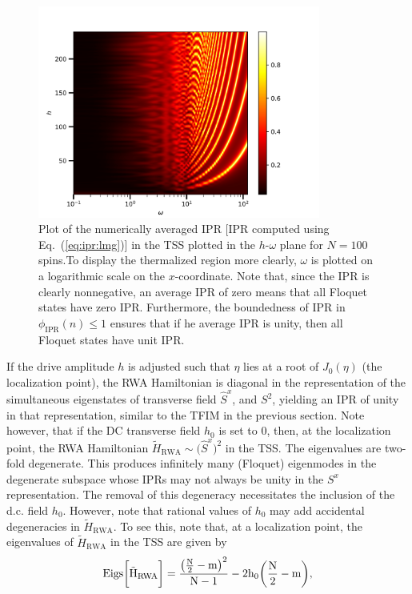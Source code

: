 \documentclass[%
reprint,
superscriptaddress,
amsmath,amssymb,
aps,
prb,
showkeys,
]{revtex4-2}
\begin{document}
\begin{figure}[t!]
	\centering
	\includegraphics[width=9.3cm]{figure_4.jpeg}
	\caption{Plot of the numerically averaged IPR [IPR computed using Eq.~(\ref{eq:ipr:lmg})] in the TSS plotted in the $h$-$\omega$ plane for $N=100$ spins.To display the thermalized region more clearly, $\omega$ is plotted on a logarithmic scale on the $x$-coordinate. Note that, since the IPR is clearly nonnegative, an average IPR of zero means that all Floquet states have zero IPR. Furthermore, the boundedness of IPR in $\phi_\mathrm{IPR}(n) \leq 1$ ensures that if he average IPR is unity, then all Floquet states have unit IPR.}
	\label{fig:lmg_phasediag}
\end{figure}
If the drive amplitude $h$ is adjusted such that $\eta$ lies at a root of $J_0(\eta)$ (the localization point), the RWA Hamiltonian is diagonal in the representation of the simultaneous eigenstates of transverse field $\hat{S}^x$, and $S^2$, yielding an IPR of unity in that representation, similar to the TFIM in the previous section. Note however, that if the DC transverse field $h_0$ is set to $0$, then, at the localization point, the RWA Hamiltonian $\tilde{H}_{\mathrm{RWA}}\sim
\big(\hat{S}^x\big)^2$ in the TSS. The eigenvalues are two-fold degenerate. This produces infinitely many (Floquet) eigenmodes in the degenerate subspace whose IPRs may not always be unity in the $S^x$ representation. The removal of this degeneracy necessitates the inclusion of the d.c. field $h_0$. However, note that rational values of $h_0$
may add accidental degeneracies in $\tilde{H}_{\mathrm{RWA}}$. To see this, note that, at a localization point, the eigenvalues of $\tilde{H}_{\mathrm{RWA}}$ in the TSS are given by
\begin{equation}
	\rm{Eigs}\bigg[\tilde{H}_{\mathrm{RWA}}\bigg] = \frac{\big(\frac{N}{2}-m\big)^2}{N-1} - 2h_0 \bigg(\frac{N}{2}-m\bigg),
\end{equation}
\end{document}

